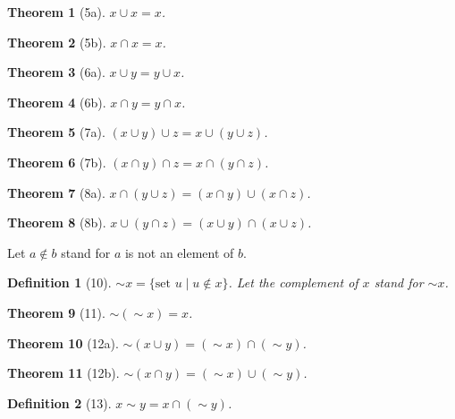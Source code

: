 \documentclass{scrartcl}
\newtheorem*{theorem}{Theorem}
\newtheorem*{definition}{Definition}
\begin{document}
\begin{theorem}[5a] $x \cup x = x$.
\end{theorem}

\begin{theorem}[5b] $x \cap x = x$.
\end{theorem}

\begin{theorem}[6a] $x \cup y = y \cup x$.
\end{theorem}

\begin{theorem}[6b] $x \cap y = y \cap x$.
\end{theorem}

\begin{theorem}[7a] $(x \cup y) \cup z = x \cup (y \cup z)$.
\end{theorem}

\begin{theorem}[7b] $(x \cap y) \cap z = x \cap (y \cap z)$.
\end{theorem}

\begin{theorem}[8a] $x \cap (y \cup z) = (x \cap y) \cup (x \cap z)$.
\end{theorem}

\begin{theorem}[8b] $x \cup (y \cap z) = (x \cup y) \cap (x \cup z)$.
\end{theorem}

Let $a \notin b$ stand for $a$ is not an element of $b$.

\begin{definition}[10] $\sim x = \{\text{set } u \mid u \notin x\}$.
Let the \emph{complement} of $x$ stand for $\sim x$.
\end{definition}

\begin{theorem}[11] $\sim (\sim x) = x$.
\end{theorem}

\begin{theorem}[12a] $\sim (x \cup y) = (\sim x) \cap (\sim y)$.
\end{theorem}

\begin{theorem}[12b] $\sim (x \cap y) = (\sim x) \cup (\sim y)$.
\end{theorem}

\begin{definition}[13] $x \sim y = x \cap (\sim y)$.
\end{definition}
\end{document}
